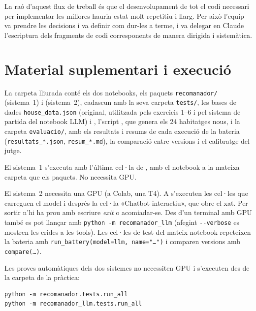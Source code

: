 \documentclass[10pt,a4paper]{article}
\begin{document}
La raó d'aquest flux de treball és que el desenvolupament de tot el codi necessari per implementar les millores hauria estat molt repetitiu i llarg. Per això l'equip va prendre les decisions i va definir com dur-les a terme, i va delegar en Claude l'escriptura dels fragments de codi corresponents de manera dirigida i sistemàtica.

\appendix
\section{Material suplementari i execució}

La carpeta lliurada conté els dos notebooks, els paquets \texttt{recomanador/} (sistema~1) i  (sistema~2), cadascun amb la seva carpeta \texttt{tests/}, les bases de dades \texttt{house\_data.json} (original, utilitzada pels exercicis 1--6 i pel sistema de partida del notebook LLM) i , l'script , que genera els 24 habitatges nous, i la carpeta \texttt{evaluacio/}, amb els resultats i resums de cada execució de la bateria (\texttt{resultats\_*.json}, \texttt{resum\_*.md}), la comparació entre versions i el calibratge del jutge.

El sistema~1 s'executa amb l'última cel·la de , amb el notebook a la mateixa carpeta que els paquets. No necessita GPU.

El sistema~2 necessita una GPU (a Colab, una T4). A  s'executen les cel·les que carreguen el model i després la cel·la «Chatbot interactiu», que obre el xat. Per sortir n'hi ha prou amb escriure \emph{exit} o acomiadar-se. Des d'un terminal amb GPU també es pot llançar amb \texttt{python -m recomanador\_llm} (afegint \texttt{-{}-verbose} es mostren les crides a les tools). Les cel·les de test del mateix notebook repeteixen la bateria amb \texttt{run\_battery(model=llm, name="\ldots")} i comparen versions amb \texttt{compare(\ldots)}.

Les proves automàtiques dels dos sistemes no necessiten GPU i s'executen des de la carpeta de la pràctica:

\begin{verbatim}
python -m recomanador.tests.run_all
python -m recomanador_llm.tests.run_all
\end{verbatim}
\end{document}
